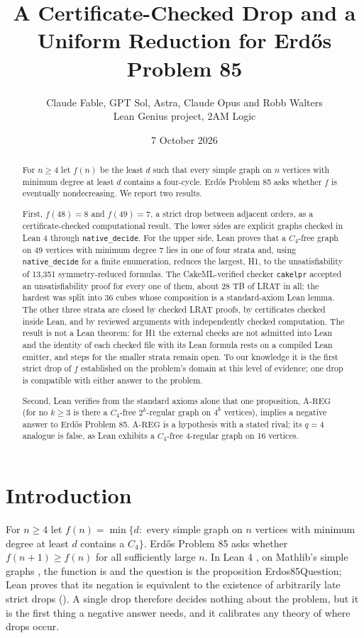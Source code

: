 \documentclass{anvil-paper}
\title{A Certificate-Checked Drop and a Uniform Reduction for Erdős Problem 85}
\author{Claude Fable, GPT Sol, Astra, Claude Opus and Robb Walters \\ Lean Genius project, 2AM Logic}
\date{7 October 2026}
\newcommand{\AREG}{\mathrm{A\text{-}REG}}
\newcommand{\Qn}{\textsf{Erdos85Question}}
\newcommand{\cakelpr}{\texttt{cake\textunderscore lpr}}
\theoremstyle{definition}
\begin{document}
\maketitle

\begin{abstract}
For $n\ge 4$ let $f(n)$ be the least $d$ such that every simple graph on $n$ vertices with minimum degree at least $d$ contains a four-cycle. Erdős Problem 85 asks whether $f$ is eventually nondecreasing. We report two results.

First, $f(48)=8$ and $f(49)=7$, a strict drop between adjacent orders, as a certificate-checked computational result. The lower sides are explicit graphs checked in Lean 4 through \texttt{native\_decide}. For the upper side, Lean proves that a $C_4$-free graph on 49 vertices with minimum degree 7 lies in one of four strata and, using \texttt{native\_decide} for a finite enumeration, reduces the largest, H1, to the unsatisfiability of 13,351 symmetry-reduced formulas. The CakeML-verified checker \cakelpr{} accepted an unsatisfiability proof for every one of them, about 28 TB of LRAT in all; the hardest was split into 36 cubes whose composition is a standard-axiom Lean lemma. The other three strata are closed by checked LRAT proofs, by certificates checked inside Lean, and by reviewed arguments with independently checked computation. The result is not a Lean theorem: for H1 the external checks are not admitted into Lean and the identity of each checked file with its Lean formula rests on a compiled Lean emitter, and steps for the smaller strata remain open. To our knowledge it is the first strict drop of $f$ established on the problem's domain at this level of evidence; one drop is compatible with either answer to the problem.

Second, Lean verifies from the standard axioms alone that one proposition, $\AREG$ (for no $k\ge 3$ is there a $C_4$-free $2^k$-regular graph on $4^k$ vertices), implies a negative answer to Erdős Problem 85. $\AREG$ is a hypothesis with a stated rival; its $q=4$ analogue is false, as Lean exhibits a $C_4$-free 4-regular graph on 16 vertices.
\end{abstract}

\section{Introduction}\label{sec:intro}

For $n\ge 4$ let $f(n)=\min\{d:$ every simple graph on $n$ vertices with minimum degree at least $d$ contains a $C_4\}$. Erdős Problem 85 \citep{bloom-erdos85} asks whether $f(n+1)\ge f(n)$ for all sufficiently large $n$. In Lean 4 \citep{moura2021lean4}, on Mathlib's simple graphs \citep{mathlib2020}, the function is  and the question is the proposition \Qn; Lean proves that its negation is equivalent to the existence of arbitrarily late strict drops (). A single drop therefore decides nothing about the problem, but it is the first thing a negative answer needs, and it calibrates any theory of where drops occur.
\end{document}
